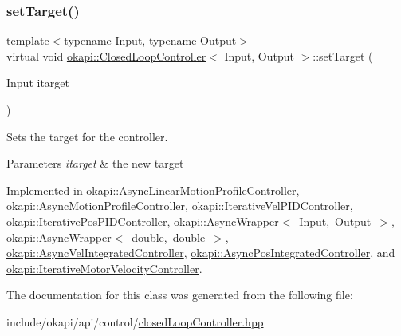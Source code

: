 \mbox{\label{classokapi_1_1ClosedLoopController_ac14482d0768b3f157d52e0214a4c36d7}} 
\subsubsection{\texorpdfstring{setTarget()}{setTarget()}}
{\footnotesize\ttfamily template$<$typename Input, typename Output$>$ \\
virtual void \mbox{\hyperlink{classokapi_1_1ClosedLoopController}{okapi\+::\+Closed\+Loop\+Controller}}$<$ Input, Output $>$\+::set\+Target (\begin{DoxyParamCaption}\item[{Input}]{itarget }\end{DoxyParamCaption})\hspace{0.3cm}{\ttfamily [pure virtual]}}

Sets the target for the controller.


\begin{DoxyParams}{Parameters}
{\em itarget} & the new target \\
\hline
\end{DoxyParams}


Implemented in \mbox{\hyperlink{classokapi_1_1AsyncLinearMotionProfileController_a18e3ba77f08cb5dd93a9cba23d4c2a1e}{okapi\+::\+Async\+Linear\+Motion\+Profile\+Controller}}, \mbox{\hyperlink{classokapi_1_1AsyncMotionProfileController_adf705d6bfd3d0a83d8a6c50a05ffd156}{okapi\+::\+Async\+Motion\+Profile\+Controller}}, \mbox{\hyperlink{classokapi_1_1IterativeVelPIDController_ab4ec4344fa758ba8cce93633aa0851d2}{okapi\+::\+Iterative\+Vel\+P\+I\+D\+Controller}}, \mbox{\hyperlink{classokapi_1_1IterativePosPIDController_a566f7d7834eefd6b542d2e231d6219f9}{okapi\+::\+Iterative\+Pos\+P\+I\+D\+Controller}}, \mbox{\hyperlink{classokapi_1_1AsyncWrapper_aa4b9a4ff29aff5047425e239b574c3c6}{okapi\+::\+Async\+Wrapper$<$ Input, Output $>$}}, \mbox{\hyperlink{classokapi_1_1AsyncWrapper_aa4b9a4ff29aff5047425e239b574c3c6}{okapi\+::\+Async\+Wrapper$<$ double, double $>$}}, \mbox{\hyperlink{classokapi_1_1AsyncVelIntegratedController_a5f1444ba57a64a21bfbdbdc57a264c2d}{okapi\+::\+Async\+Vel\+Integrated\+Controller}}, \mbox{\hyperlink{classokapi_1_1AsyncPosIntegratedController_ae5cb385dc40c2c183266a3fa4aed7cac}{okapi\+::\+Async\+Pos\+Integrated\+Controller}}, and \mbox{\hyperlink{classokapi_1_1IterativeMotorVelocityController_a9a5a1d57df3faa75474245200ed34a18}{okapi\+::\+Iterative\+Motor\+Velocity\+Controller}}.



The documentation for this class was generated from the following file\+:\begin{DoxyCompactItemize}
\item 
include/okapi/api/control/\mbox{\hyperlink{closedLoopController_8hpp}{closed\+Loop\+Controller.\+hpp}}\end{DoxyCompactItemize}
